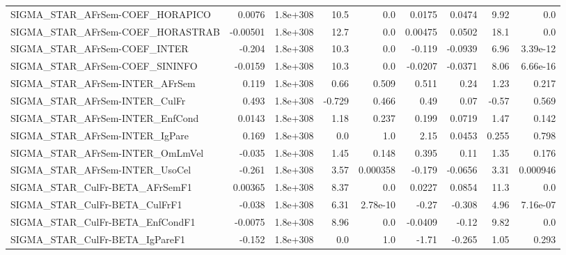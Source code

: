 \begin{tabular}{lrrrrrrrr}
SIGMA\_STAR\_AFrSem-COEF\_HORAPICO       &      0.0076 &     1.8e+308 &     10.5 &      0.0 &     0.0175 &      0.0474 &         9.92 &           0.0 \\
SIGMA\_STAR\_AFrSem-COEF\_HORASTRAB      &    -0.00501 &     1.8e+308 &     12.7 &      0.0 &    0.00475 &      0.0502 &         18.1 &           0.0 \\
SIGMA\_STAR\_AFrSem-COEF\_INTER          &      -0.204 &     1.8e+308 &     10.3 &      0.0 &     -0.119 &     -0.0939 &         6.96 &      3.39e-12 \\
SIGMA\_STAR\_AFrSem-COEF\_SININFO        &     -0.0159 &     1.8e+308 &     10.3 &      0.0 &    -0.0207 &     -0.0371 &         8.06 &      6.66e-16 \\
SIGMA\_STAR\_AFrSem-INTER\_AFrSem        &       0.119 &     1.8e+308 &     0.66 &    0.509 &      0.511 &        0.24 &         1.23 &         0.217 \\
SIGMA\_STAR\_AFrSem-INTER\_CulFr         &       0.493 &     1.8e+308 &   -0.729 &    0.466 &       0.49 &        0.07 &        -0.57 &         0.569 \\
SIGMA\_STAR\_AFrSem-INTER\_EnfCond       &      0.0143 &     1.8e+308 &     1.18 &    0.237 &      0.199 &      0.0719 &         1.47 &         0.142 \\
SIGMA\_STAR\_AFrSem-INTER\_IgPare        &       0.169 &     1.8e+308 &      0.0 &      1.0 &       2.15 &      0.0453 &        0.255 &         0.798 \\
SIGMA\_STAR\_AFrSem-INTER\_OmLmVel       &      -0.035 &     1.8e+308 &     1.45 &    0.148 &      0.395 &        0.11 &         1.35 &         0.176 \\
SIGMA\_STAR\_AFrSem-INTER\_UsoCel        &      -0.261 &     1.8e+308 &     3.57 & 0.000358 &     -0.179 &     -0.0656 &         3.31 &      0.000946 \\
SIGMA\_STAR\_CulFr-BETA\_AFrSemF1        &     0.00365 &     1.8e+308 &     8.37 &      0.0 &     0.0227 &      0.0854 &         11.3 &           0.0 \\
SIGMA\_STAR\_CulFr-BETA\_CulFrF1         &      -0.038 &     1.8e+308 &     6.31 & 2.78e-10 &      -0.27 &      -0.308 &         4.96 &      7.16e-07 \\
SIGMA\_STAR\_CulFr-BETA\_EnfCondF1       &     -0.0075 &     1.8e+308 &     8.96 &      0.0 &    -0.0409 &       -0.12 &         9.82 &           0.0 \\
SIGMA\_STAR\_CulFr-BETA\_IgPareF1        &      -0.152 &     1.8e+308 &      0.0 &      1.0 &      -1.71 &      -0.265 &         1.05 &         0.293 \\

\end{tabular}
